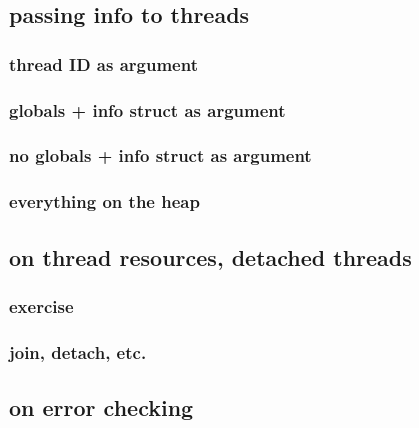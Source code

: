 \subsection{passing info to threads}

\subsubsection{thread ID as argument}


\subsubsection{globals + info struct as argument}



\subsubsection{no globals + info struct as argument}



\subsubsection{everything on the heap}



\subsection{on thread resources, detached threads}

\subsubsection{exercise}


\subsubsection{join, detach, etc.}


\subsection{on error checking}


